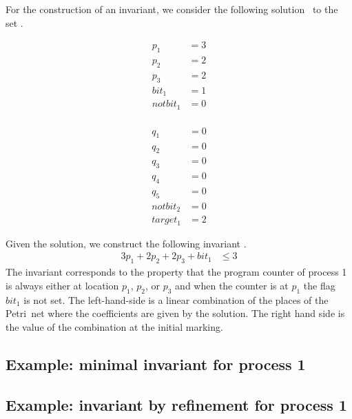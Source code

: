 For the construction of an invariant, we consider the
following solution \solA\ to the set \setCp.
\\[-2em]
\begin{minipage}[t]{.49\columnwidth}
  \begin{align*}
    p_1      & = 3 \\[-0.4em]
    p_2      & = 2 \\[-0.4em]
    p_3      & = 2 \\[-0.4em]
    bit_1    & = 1 \\[-0.4em]
    notbit_1 & = 0 \\[-0.4em]
  \end{align*}
\end{minipage}
\begin{minipage}[t]{.49\columnwidth}
  \begin{align*}
    q_1      & = 0 \\[-0.4em]
    q_2      & = 0 \\[-0.4em]
    q_3      & = 0 \\[-0.4em]
    q_4      & = 0 \\[-0.4em]
    q_5      & = 0 \\[-0.4em]
    notbit_2 & = 0 \\[-0.4em]
    target_1 & = 2
  \end{align*}
\end{minipage}

Given the solution, we construct the following
invariant \invI.
\begin{align*}
  3 p_1 + 2 p_2 + 2 p_3 + bit_1 & \le 3
\end{align*}
The invariant corresponds to the property that the program
counter of process 1 is always either at location $p_1$, $p_2$, or
$p_3$ and when the counter is at $p_1$ the flag $bit_1$ is not set.
The left-hand-side is a linear combination of the places of the
Petri~net where the coefficients are given by the solution.
The right hand side is the value of the combination at the initial
marking.



\subsection{Example: minimal invariant for process 1}


\subsection{Example: invariant by refinement for process 1}



